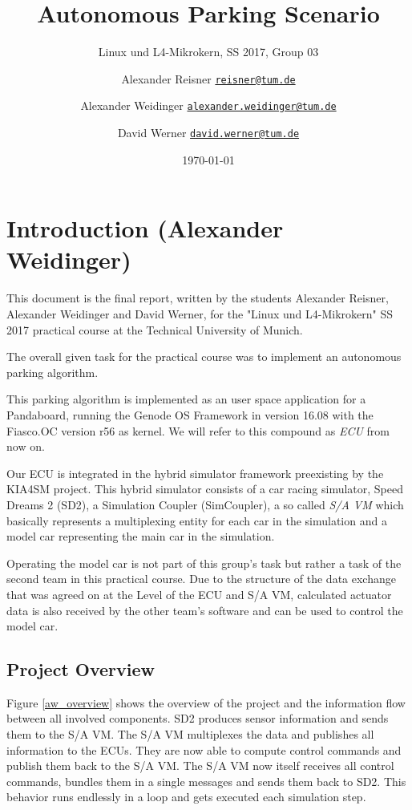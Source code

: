 \documentclass[paper=a4, fontsize=11pt]{scrreprt}
\title{Autonomous Parking Scenario}
\subtitle{Linux und L4-Mikrokern, SS 2017, Group 03}
\author{Alexander Reisner \href{mailto:reisner@tum.de}{\texttt{reisner@tum.de}} \and
Alexander Weidinger \href{mailto:alexander.weidinger@tum.de}{\texttt{alexander.weidinger@tum.de}} \and
David Werner \href{mailto:david.werner@tum.de}{\texttt{david.werner@tum.de}}}
\date{\today}
\begin{document}
\maketitle
\newpage

\tableofcontents
\newpage

\chapter{Introduction (Alexander Weidinger)}
This document is the final report, written by the students Alexander Reisner,
Alexander Weidinger and David Werner, for the "Linux und L4-Mikrokern" SS 2017 practical course at the Technical University of Munich.

The overall given task for the practical course was to implement an autonomous parking algorithm.

This parking algorithm is implemented as an user space application for a Pandaboard,
running the Genode OS Framework in version 16.08 with the Fiasco.OC version r56 as kernel.
We will refer to this compound as \textit{ECU} from now on.

Our ECU is integrated in the hybrid simulator framework preexisting by the KIA4SM project.
This hybrid simulator consists of a car racing simulator, Speed Dreams 2 (SD2),
a Simulation Coupler (SimCoupler), a so called \textit{S/A VM} which basically represents a multiplexing entity for each car in the simulation
and a model car representing the main car in the simulation.

Operating the model car is not part of this group's task but rather a task of the second team in this practical course.
Due to the structure of the data exchange that was agreed on at the Level of the ECU and S/A VM,
calculated actuator data is also received by the other team's software and can be used to control the model car.

\section{Project Overview}
Figure \ref{aw_overview} shows the overview of the project and the information flow between all involved components.
SD2 produces sensor information and sends them to the S/A VM.
The S/A VM multiplexes the data and publishes all information to the ECUs.
They are now able to compute control commands and publish them back to the S/A VM.
The S/A VM now itself receives all control commands, bundles them in a single messages
and sends them back to SD2.
This behavior runs endlessly in a loop and gets executed each simulation step.
\end{document}
